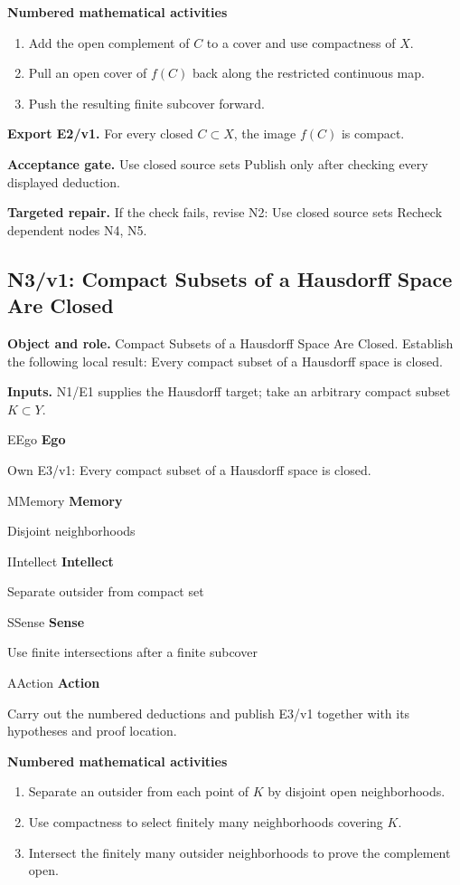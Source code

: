 \documentclass[preprint,12pt,aps,pra,showkeys,amsmath,amssymb,superscriptaddress,floatfix]{revtex4-2}
\theoremstyle{definition}
\theoremstyle{remark}
\newcommand{\mmfaculty}[3]{%
 \begin{mmfacultybox}{#1}{#2}
 {\sffamily\bfseries\color{MMBlue}#2}\par\smallskip #3
 \end{mmfacultybox}}
\newcommand{\field}[2]{\par\smallskip\noindent\textbf{#1.} #2\par}
\begin{document}
\smallskip\noindent\textbf{Numbered mathematical activities}

\begin{enumerate}[label=N2.\arabic*,leftmargin=3.4em]

\item Add the open complement of \(C\) to a cover and use compactness of
\(X\).

\item Pull an open cover of \(f(C)\) back along the restricted continuous map.

\item Push the resulting finite subcover forward.

\end{enumerate}

\field{Export E2/v1}{For every closed \(C\subset X\), the image \(f(C)\) is compact.}

\field{Acceptance gate}{Use closed source sets Publish only after checking every displayed
deduction.}

\field{Targeted repair}{If the check fails, revise N2: Use closed source sets Recheck dependent
nodes N4, N5.}

\clearpage

\subsection{N3/v1: Compact Subsets of a Hausdorff Space Are Closed}

\field{Object and role}{Compact Subsets of a Hausdorff Space Are Closed. Establish the following
local result: Every compact subset of a Hausdorff space is closed.}

\field{Inputs}{N1/E1 supplies the Hausdorff target; take an arbitrary compact subset
\(K\subset Y\).}

\mmfaculty{E}{Ego}{Own E3/v1: Every compact subset of a Hausdorff space is closed.}

\mmfaculty{M}{Memory}{Disjoint neighborhoods}

\mmfaculty{I}{Intellect}{Separate outsider from compact set}

\mmfaculty{S}{Sense}{Use finite intersections after a finite subcover}

\mmfaculty{A}{Action}{Carry out the numbered deductions and publish E3/v1 together with its
hypotheses and proof location.}

\smallskip\noindent\textbf{Numbered mathematical activities}

\begin{enumerate}[label=N3.\arabic*,leftmargin=3.4em]

\item Separate an outsider from each point of \(K\) by disjoint open
neighborhoods.

\item Use compactness to select finitely many neighborhoods covering \(K\).

\item Intersect the finitely many outsider neighborhoods to prove the
complement open.

\end{enumerate}
\end{document}
